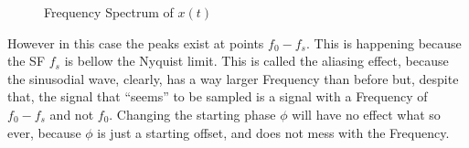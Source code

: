 \documentclass[12pt, a4paper]{article}
\begin{document}
\begin{enumerate}
\begin{enumerate}
\begin{figure}[H]
            \caption{Frequency Spectrum of \(x(t)\)}
        \end{figure}
    \end{enumerate}
    However in this case the peaks exist at points \(f_0 - f_s\). This is happening because the SF \(f_s\) is bellow the Nyquist
    limit. This is called the aliasing effect, because the sinusodial wave, clearly, has a way larger Frequency than before but, despite 
    that, the signal that ``seems'' to be sampled is a signal with a Frequency of \(f_0 - f_s\) and not \(f_0\).
    Changing the starting phase \(\phi \) will have no effect what so ever, because \(\phi \) is just a starting offset, and does not mess with 
    the Frequency.
\end{enumerate}
\end{document}
